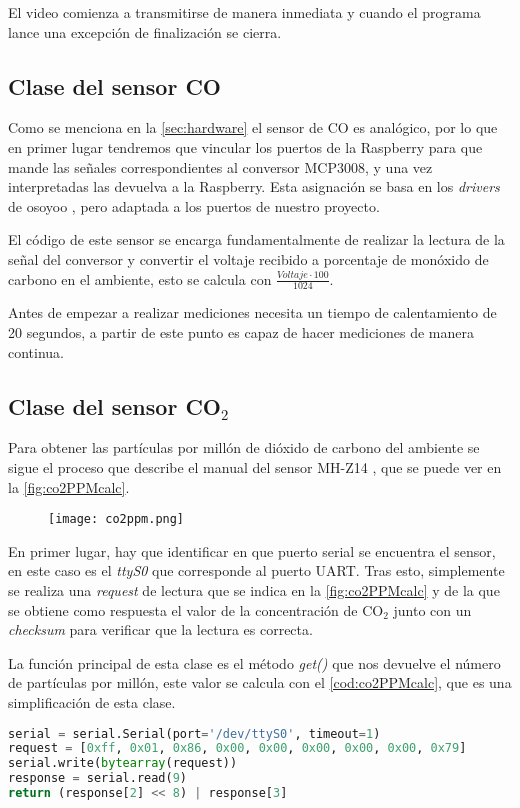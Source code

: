 El video comienza a transmitirse de manera inmediata y cuando el programa lance una excepción de finalización se cierra.

\subsection{Clase del sensor CO}
Como se menciona en la \autoref{sec:hardware} el sensor de CO es analógico, por lo que en primer lugar tendremos que vincular los puertos de la Raspberry para que mande las señales correspondientes al conversor MCP3008, y una vez interpretadas las devuelva a la Raspberry. Esta asignación se basa en los \textit{drivers} de osoyoo \cite{osoyoo_osoyoodriver_2021}, pero adaptada a los puertos de nuestro proyecto.

El código de este sensor se encarga fundamentalmente de realizar la lectura de la señal del conversor y convertir el voltaje recibido a porcentaje de monóxido de carbono en el ambiente, esto se calcula con $\frac{\textit{Voltaje}\cdot 100}{1024}$. 

Antes de empezar a realizar mediciones necesita un tiempo de calentamiento de 20 segundos, a partir de este punto es capaz de hacer mediciones de manera continua.

\subsection{Clase del sensor \texorpdfstring{CO$_2$}{CO2}}
Para obtener las partículas por millón de dióxido de carbono del ambiente se sigue el proceso que describe el manual del sensor MH-Z14 \cite{noauthor_documentacion_nodate}, que se puede ver en la \autoref{fig:co2PPMcalc}.
\begin{figure}[H]
    {\texttt{[image: co2ppm.png]}}
\end{figure}
En primer lugar, hay que identificar en que puerto serial se encuentra el sensor, en este caso es el \textit{ttyS0} que corresponde al puerto UART. Tras esto, simplemente se realiza una \textit{request} de lectura que se indica en la \autoref{fig:co2PPMcalc} y de la que se obtiene como respuesta el valor de la concentración de CO$_2$ junto con un \textit{checksum} para verificar que la lectura es correcta.

La función principal de esta clase es el método \textit{get()} que nos devuelve el número de partículas por millón, este valor se calcula con el \autoref{cod:co2PPMcalc}, que es una simplificación de esta clase.
\begin{lstlisting}[language=Python, label=cod:co2PPMcalc, caption=Calculo de la concentración de CO$_2$]
serial = serial.Serial(port='/dev/ttyS0', timeout=1)
request = [0xff, 0x01, 0x86, 0x00, 0x00, 0x00, 0x00, 0x00, 0x79]
serial.write(bytearray(request))
response = serial.read(9)
return (response[2] << 8) | response[3]
\end{lstlisting} 


